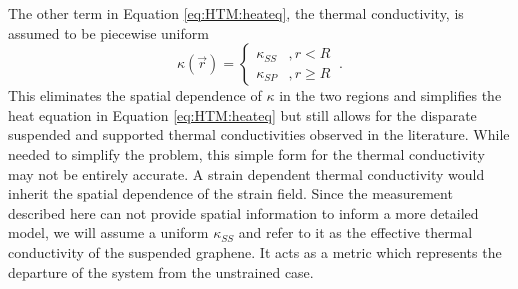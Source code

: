 The other term in Equation \ref{eq:HTM:heateq}, the thermal conductivity, is assumed to be piecewise uniform
\begin{equation*}
	\kappa (\vec{r})=\left \{ \begin{array}{ll} \kappa_{SS} & , r<R \\ \kappa_{SP} & , r \geq R \end{array} \right. \ .
\end{equation*}
This eliminates the spatial dependence of $\kappa$ in the two regions and simplifies the heat equation in Equation \ref{eq:HTM:heateq} but still allows for the disparate suspended and supported thermal conductivities observed in the literature.
While needed to simplify the problem, this simple form for the thermal conductivity may not be entirely accurate. 
A strain dependent thermal conductivity would inherit the spatial dependence of the strain field.
Since the measurement described here can not provide spatial information to inform a more detailed model, we will assume a uniform $\kappa_{SS}$ and refer to it as the effective thermal conductivity of the suspended graphene.
It acts as a metric which represents the departure of the system from the unstrained case.

